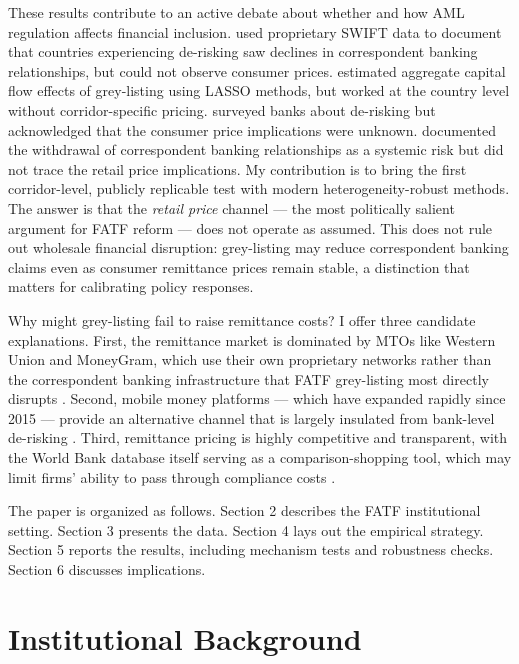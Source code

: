 \documentclass[12pt]{article}
\begin{document}
These results contribute to an active debate about whether and how AML regulation affects financial inclusion. \citet{cgd2016} used proprietary SWIFT data to document that countries experiencing de-risking saw declines in correspondent banking relationships, but could not observe consumer prices. \citet{imf2021wps} estimated aggregate capital flow effects of grey-listing using LASSO methods, but worked at the country level without corridor-specific pricing. \citet{fsb2018} surveyed banks about de-risking but acknowledged that the consumer price implications were unknown. \citet{erbenova2016} documented the withdrawal of correspondent banking relationships as a systemic risk but did not trace the retail price implications. My contribution is to bring the first corridor-level, publicly replicable test with modern heterogeneity-robust methods. The answer is that the \emph{retail price} channel --- the most politically salient argument for FATF reform --- does not operate as assumed. This does not rule out wholesale financial disruption: grey-listing may reduce correspondent banking claims even as consumer remittance prices remain stable, a distinction that matters for calibrating policy responses.

Why might grey-listing fail to raise remittance costs? I offer three candidate explanations. First, the remittance market is dominated by MTOs like Western Union and MoneyGram, which use their own proprietary networks rather than the correspondent banking infrastructure that FATF grey-listing most directly disrupts \citep{worldbank2024}. Second, mobile money platforms --- which have expanded rapidly since 2015 --- provide an alternative channel that is largely insulated from bank-level de-risking \citep{gsma2023}. Third, remittance pricing is highly competitive and transparent, with the World Bank database itself serving as a comparison-shopping tool, which may limit firms' ability to pass through compliance costs \citep{beck2018}.

The paper is organized as follows. Section 2 describes the FATF institutional setting. Section 3 presents the data. Section 4 lays out the empirical strategy. Section 5 reports the results, including mechanism tests and robustness checks. Section 6 discusses implications.


\section{Institutional Background}
\end{document}
